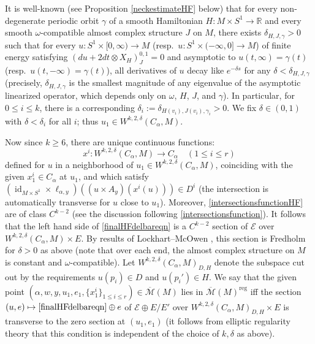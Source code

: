 \documentclass[12pt]{article}
\theoremstyle{definition}
\theoremstyle{remark}
\numberwithin{equation}{subsection}
\newcommand{\E}{\mathcal E}
\newcommand{\RR}{\mathbb R}
\newcommand{\Mbar}{\overline{\mathcal M}}
\newcommand{\id}{\operatorname{id}}
\newcommand{\reg}{\mathrm{reg}}
\begin{document}
It is well-known (see Proposition \ref{neckestimateHF} below) that for every non-degenerate periodic orbit $\gamma$ of a smooth Hamiltonian $H:M\times S^1\to\RR$ and every smooth $\omega$-compatible almost complex structure $J$ on $M$, there exists $\delta_{H,J,\gamma}>0$ such that for every $u:S^1\times[0,\infty)\to M$ (resp.\ $u:S^1\times(-\infty,0]\to M$) of finite energy satisfying $(du+2dt\otimes X_H)^{0,1}_J=0$ and asymptotic to $u(t,\infty)=\gamma(t)$ (resp.\ $u(t,-\infty)=\gamma(t)$), all derivatives of $u$ decay like $e^{-\delta s}$ for any $\delta<\delta_{H,J,\gamma}$ (precisely, $\delta_{H,J,\gamma}$ is the smallest magnitude of any eigenvalue of the asymptotic linearized operator, which depends only on $\omega$, $H$, $J$, and $\gamma$).  In particular, for $0\leq i\leq k$, there is a corresponding $\delta_i:=\delta_{H(v_i),J(v_i),\gamma_i}>0$.  We fix $\delta\in(0,1)$ with $\delta<\delta_i$ for all $i$; thus $u_1\in W^{k,2,\delta}(C_\alpha,M)$.

Now since $k\geq 6$, there are unique continuous functions:
\begin{equation}\label{intersectionsfunctionHF}
x^i:W^{k,2,\delta}(C_\alpha,M)\to C_\alpha\quad(1\leq i\leq r)
\end{equation}
defined for $u$ in a neighborhood of $u_1\in W^{k,2,\delta}(C_\alpha,M)$, coinciding with the given $x^i_1\in C_\alpha$ at $u_1$, and which satisfy $(\id_{M\times S^1}\times\ell_{\alpha,y})((u\times A_y)(x^i(u)))\in D^i$ (the intersection is automatically transverse for $u$ close to $u_1$).  Moreover, \eqref{intersectionsfunctionHF} are of class $C^{k-2}$ (see the discussion following \eqref{intersectionsfunction}).  It follows that the left hand side of \eqref{finalHFdelbareqn} is a $C^{k-2}$ section of $\E$ over $W^{k,2,\delta}(C_\alpha,M)\times E$.  By results of Lockhart--McOwen \cite{lockhartmcowen}, this section is Fredholm for $\delta>0$ as above (note that over each end, the almost complex structure on $M$ is constant and $\omega$-compatible).  Let $W^{k,2,\delta}(C_\alpha,M)_{D,H}$ denote the subspace cut out by the requirements $u(p_i)\in D$ and $u(p_i')\in H$.  We say that the given point $(\alpha,w,y,u_1,e_1,\{x^i_1\}_{1\leq i\leq r})\in\Mbar(M)$ lies in $\Mbar(M)^\reg$ iff the section $(u,e)\mapsto\eqref{finalHFdelbareqn}\oplus e$ of $\E\oplus E/E'$ over $W^{k,2,\delta}(C_\alpha,M)_{D,H}\times E$ is transverse to the zero section at $(u_1,e_1)$ (it follows from elliptic regularity theory that this condition is independent of the choice of $k,\delta$ as above).
\end{document}
